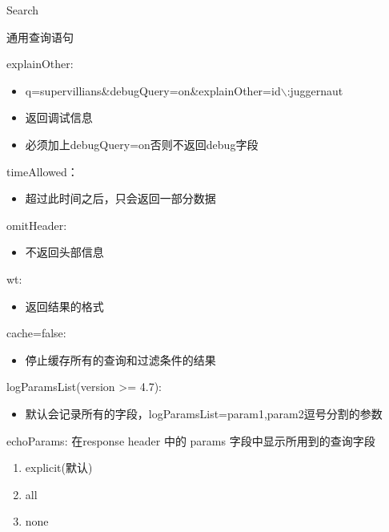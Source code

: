 \documentclass[presentation]{beamer}
\begin{document}
\begin{frame}[fragile,label={sec:org1ccf379}]{Search}
\begin{block}{通用查询语句}
\begin{block}{explainOther:}
\begin{itemize}
\item q=supervillians\&debugQuery=on\&explainOther=id$\backslash$:juggernaut
\item 返回调试信息
\item 必须加上debugQuery=on否则不返回debug字段
\end{itemize}
\end{block}

\begin{block}{timeAllowed：}
\begin{itemize}
\item 超过此时间之后，只会返回一部分数据
\end{itemize}
\end{block}

\begin{block}{omitHeader:}
\begin{itemize}
\item 不返回头部信息
\end{itemize}
\end{block}

\begin{block}{wt:}
\begin{itemize}
\item 返回结果的格式
\end{itemize}
\end{block}

\begin{block}{cache=false:}
\begin{itemize}
\item 停止缓存所有的查询和过滤条件的结果
\end{itemize}
\end{block}

\begin{block}{logParamsList(version >= 4.7):}
\begin{itemize}
\item 默认会记录所有的字段，logParamsList=param1,param2逗号分割的参数
\end{itemize}
\end{block}

\begin{block}{echoParams:}
在response header 中的 params 字段中显示所用到的查询字段
\begin{enumerate}
\item explicit(默认)
\item all
\item none
\end{enumerate}
\end{block}
\end{block}



\end{frame}
\end{document}
